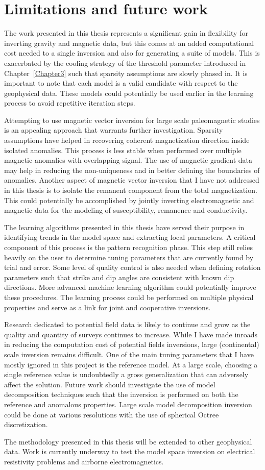 \section{Limitations and future work}

The work presented in this thesis represents a significant gain in flexibility for inverting gravity and magnetic data, but this comes at an added computational cost needed to a single inversion and also for generating a suite of models. This is exacerbated by the cooling strategy of the threshold parameter introduced in Chapter~\ref{Chapter3} such that sparsity assumptions are slowly phased in. It is important to note that each model is a valid candidate with respect to the geophysical data. These models could potentially be used earlier in the learning process to avoid repetitive iteration steps.

Attempting to use magnetic vector inversion for large scale paleomagnetic studies is an appealing approach that warrants further investigation. Sparsity assumptions have helped in recovering coherent magnetization direction inside isolated anomalies. This process is less stable when performed over multiple magnetic anomalies with overlapping signal. The use of magnetic gradient data may help in reducing the non-uniqueness and in better defining the boundaries of anomalies.
Another aspect of magnetic vector inversion that I have not addressed in this thesis is to isolate the remanent component from the total magnetization. This could potentially be accomplished by jointly inverting electromagnetic and magnetic data for the modeling of susceptibility, remanence and conductivity.

The learning algorithms presented in this thesis have served their purpose in identifying trends in the model space and extracting local parameters. A critical component of this process is the pattern recognition phase. This step still relies heavily on the user to determine tuning parameters that are currently found by trial and error. Some level of quality control is also needed when defining rotation parameters such that strike and dip angles are consistent with known dip directions. More advanced machine learning algorithm could potentially improve these procedures.
The learning process could be performed on multiple physical properties and serve as a link for joint and cooperative inversions.

Research dedicated to potential field data is likely to continue and grow as the quality and quantity of surveys continues to increase. While I have made inroads in reducing the computation cost of potential fields inversions, large (continental) scale inversion remains difficult. One of the main tuning parameters that I have mostly ignored in this project is the reference model. At a large scale, choosing a single reference value is undoubtedly a gross generalization that can adversely affect the solution. Future work should investigate the use of model decomposition techniques such that the inversion is performed on both the reference and anomalous properties. Large scale model decomposition inversion could be done at various resolutions with the use of spherical Octree discretization.

The methodology presented  in this thesis will be extended to other geophysical data. Work is currently underway to test the model space inversion on electrical resistivity problems and airborne electromagnetics.


\endinput

